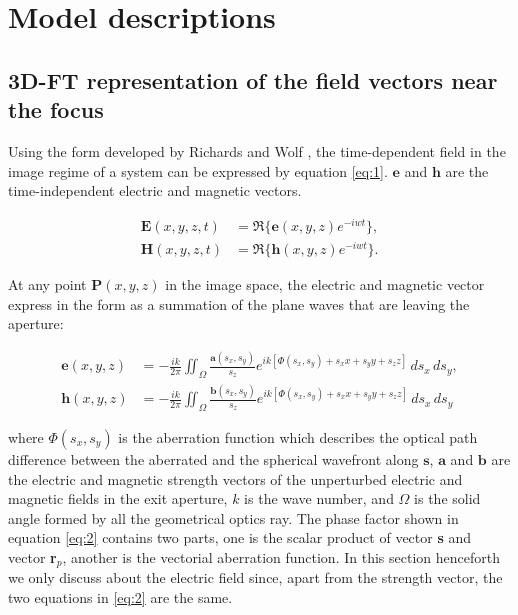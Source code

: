 \documentclass[9pt,twocolumn,twoside]{osajnl}
\begin{document}
\section{Model descriptions} \label{section:2}
\subsection{3D-FT representation of the field vectors near the focus}
Using the form developed by Richards and Wolf \cite{richards1959electromagnetic}, the time-dependent field in the image regime of a system can be expressed by equation \eqref{eq:1}. $\textbf{e}$ and $\textbf{h}$ are the time-independent electric and magnetic vectors.

\begin{equation}\label{eq:1}
	\begin{aligned}
		\textbf{E}(x, y, z, t)&=\Re\{\textbf{e}(x, y, z)e^{-iwt}\},\\
		\textbf{H}(x, y, z, t)&=\Re\{\textbf{h}(x, y, z)e^{-iwt}\}.
	\end{aligned}	
\end{equation}

At any point $\textbf{P}(x,y,z)$ in the image space, the electric and magnetic vector express in the form as a summation of the plane waves that are leaving the aperture:

\begin{equation}
	\begin{aligned}\label{eq:2}
		\textbf{e}(x, y, z)&=-\frac{ik}{2\pi}\iint_\Omega\frac{\textbf{a}(s_x, s_y)}{s_z}e^{ik[\textbf{$\Phi$}(s_x, s_y)+s_xx+s_yy+s_zz]}\,ds_x\,ds_y,\\
		\textbf{h}(x, y, z)&=-\frac{ik}{2\pi}\iint_\Omega\frac{\textbf{b}(s_x, s_y)}{s_z}e^{ik[\textbf{$\Phi$}(s_x, s_y)+s_xx+s_yy+s_zz]}\,ds_x\,ds_y
	\end{aligned}
\end{equation}

where $\textbf{$\Phi$}(s_x, s_y)$ is the aberration function which describes the optical path difference between the aberrated and the spherical wavefront along $\textbf{s}$, $\textbf{a}$ and $\textbf{b}$ are the electric and magnetic strength vectors of the unperturbed electric and magnetic fields in the exit aperture, $k$ is the wave number, and $\Omega$ is the solid angle formed by all the geometrical optics ray. The phase factor shown in equation \eqref{eq:2} contains two parts, one is the scalar product of vector \textbf{s} and vector \textbf{r}$_p$, another is the vectorial aberration function. In this section henceforth we only discuss about the electric field since, apart from the strength vector, the two equations in \eqref{eq:2} are the same. 
\end{document}
